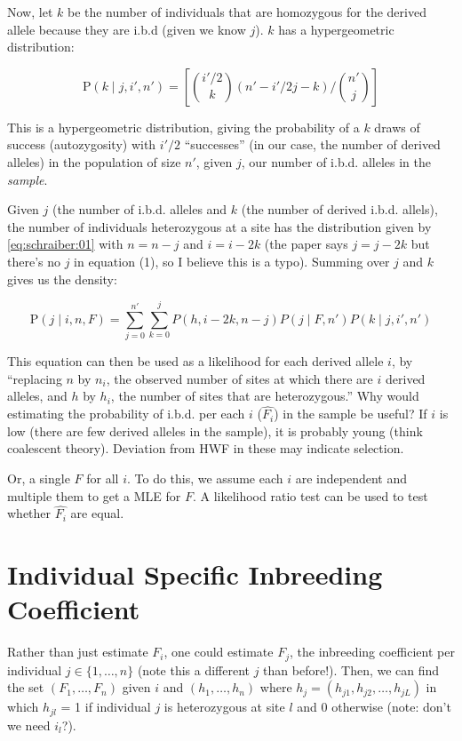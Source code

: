 \documentclass[12pt]{article}\usepackage[]{graphicx}\usepackage[]{color}
\begin{document}
Now, let $k$ be the number of individuals that are homozygous for the
derived allele because they are i.b.d (given we know $j$). $k$ has a
hypergeometric distribution:

\begin{equation} \label{eq:schraiber:03}
\text{P}(k \mid j, i', n') = \left[  {i'/2 \choose k} \left( n' - i'/2j - k \right) / {n' \choose j} \right]
\end{equation}

This is a hypergeometric distribution, giving the probability of a $k$
draws of success (autozygosity) with $i'/2$ ``successes'' (in our
case, the number of derived alleles) in the population of size $n'$,
given $j$, our number of i.b.d. alleles in the \emph{sample}. 

Given $j$ (the number of i.b.d. alleles and $k$ (the number of derived
i.b.d. allels), the number of individuals heterozygous at a site has
the distribution given by \autoref{eq:schraiber:01} with $n = n - j$
and $i = i - 2k$ (the paper says $j = j - 2k$ but there's no $j$ in
equation (1), so I believe this is a typo). Summing over $j$ and $k$
gives us the density:

\begin{equation} \label{eq:schraiber:04}
\text{P}(j \mid i, n, F) = \sum_{j=0}^{n'}\sum_{k=0}^{j} P(h, i - 2k, n - j) P(j \mid F, n') P(k \mid j, i', n')
\end{equation}

This equation can then be used as a likelihood for each derived allele
$i$, by ``replacing $n$ by $n_i$, the observed number of sites at
which there are $i$ derived alleles, and $h$ by $h_i$, the number of
sites that are heterozygous.'' Why would estimating the probability of
i.b.d. per each $i$ ($\hat{F_i}$) in the sample be useful? If $i$ is
low (there are few derived alleles in the sample), it is probably
young (think coalescent theory). Deviation from HWF in these may
indicate selection.

Or, a single $F$ for all $i$. To do this, we assume each $i$ are
independent and multiple them to get a MLE for $F$. A likelihood ratio
test can be used to test whether $\hat{F_i}$ are equal.

\section{Individual Specific Inbreeding Coefficient}

Rather than just estimate $F_i$, one could estimate $F_j$, the
inbreeding coefficient per individual $j \in \{1, \ldots, n\}$ (note
this a different $j$ than before!). Then, we can find the set $(F_1,
\ldots, F_n)$ given $i$ and $(h_1, \ldots, h_n)$ where $h_j = (h_{j1},
h_{j2}, \ldots, h_{jL})$ in which $h_{jl}$ = 1 if individual $j$ is
heterozygous at site $l$ and 0 otherwise (note: don't we need $i_l$?).
\end{document}

